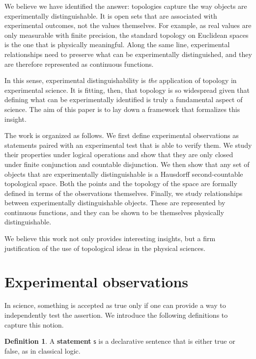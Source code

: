 \documentclass[review]{elsarticle}
\theoremstyle{plain}%
\theoremstyle{definition}
\newtheorem{defn}{Definition}[section]
\theoremstyle{remark}
\begin{document}
We believe we have identified the answer: topologies capture the way objects are experimentally distinguishable. It is open sets that are associated with experimental outcomes, not the values themselves. For example, as real values are only measurable with finite precision, the standard topology on Euclidean spaces is the one that is physically meaningful. Along the same line, experimental relationships need to preserve what can be experimentally distinguished, and they are therefore represented as continuous functions.

In this sense, experimental distinguishability is \emph{the} application of topology in experimental science. It is fitting, then, that topology is so widespread given that defining what can be experimentally identified is truly a fundamental aspect of science. The aim of this paper is to lay down a framework that formalizes this insight. 

The work is organized as follows. We first define experimental observations as statements paired with an experimental test that is able to verify them. We study their properties under logical operations and show that they are only closed under finite conjunction and countable disjunction.  We then show that any set of objects that are experimentally distinguishable is a Hausdorff second-countable topological space. Both the points and the topology of the space are formally defined in terms of the observations themselves.  Finally, we study relationships between experimentally distinguishable objects. These are represented by continuous functions, and they can be shown to be themselves physically distinguishable.

We believe this work not only provides interesting insights, but a firm justification of the use of topological ideas in the physical sciences.

\section{Experimental observations}

In science, something is accepted as true only if one can provide a way to independently test the assertion. We introduce the following definitions to capture this notion.


\begin{defn}
	A \textbf{statement} $\mathsf{s}$ is a declarative sentence that is either true or false, as in classical logic.
\end{defn}
\end{document}
